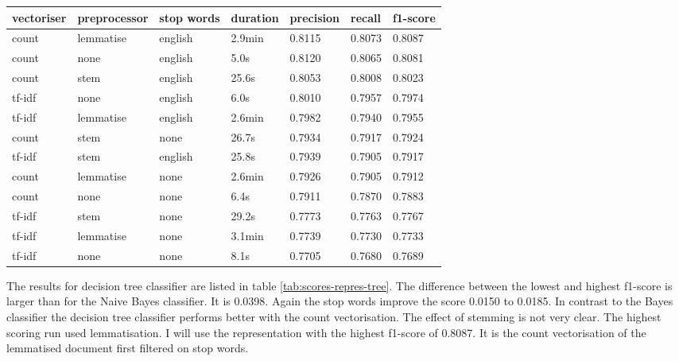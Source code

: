 \documentclass[11pt]{article}
\begin{document}
\begin{table*}[h]\footnotesize
\centering
\label{tab:scores-repres-tree}
\begin{tabular}{ l l l l l l l }
vectoriser & preprocessor & stop words & duration & precision & recall & f1-score \\
\hline
count & lemmatise & english & 2.9min & 0.8115 & 0.8073 & 0.8087 \\
count & none & english & 5.0s & 0.8120 & 0.8065 & 0.8081 \\
count & stem & english & 25.6s & 0.8053 & 0.8008 & 0.8023 \\
tf-idf & none & english & 6.0s & 0.8010 & 0.7957 & 0.7974 \\
tf-idf & lemmatise & english & 2.6min &  0.7982 & 0.7940 & 0.7955 \\
count & stem & none & 26.7s & 0.7934 & 0.7917 & 0.7924 \\
tf-idf & stem & english & 25.8s & 0.7939 & 0.7905 & 0.7917 \\
count & lemmatise & none & 2.6min & 0.7926 & 0.7905 & 0.7912 \\
count & none & none & 6.4s & 0.7911 & 0.7870 & 0.7883 \\
tf-idf & stem & none & 29.2s & 0.7773 & 0.7763 & 0.7767 \\
tf-idf & lemmatise & none & 3.1min & 0.7739 & 0.7730 & 0.7733 \\
tf-idf & none & none & 8.1s & 0.7705 & 0.7680  & 0.7689 \\
\end{tabular}
\caption{scores for different representations and the decision tree classifier sorted by f1-score}
\end{table*}

The results for decision tree classifier are listed in table \ref{tab:scores-repres-tree}. The difference between the lowest and highest f1-score is larger than for the Naive Bayes classifier. It is 0.0398. Again the stop words improve the score 0.0150 to 0.0185. In contrast to the Bayes classifier the decision tree classifier performs better with the count vectorisation. The effect of stemming is not very clear. The highest scoring run used lemmatisation. I will use the representation with the highest f1-score of 0.8087. It is the count vectorisation of the lemmatised document first filtered on stop words.
\end{document}
